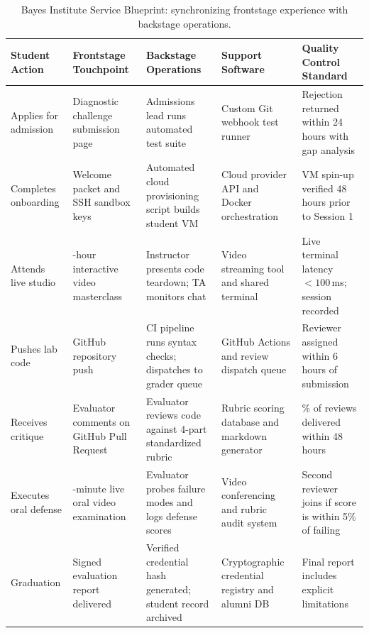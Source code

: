 \begin{table}[t]
\centering
\small
\begin{tabularx}{\textwidth}{>{\raggedright\arraybackslash}p{2.5cm} >{\raggedright\arraybackslash}p{3.2cm} >{\raggedright\arraybackslash}p{3.5cm} >{\raggedright\arraybackslash}p{3.8cm} >{\raggedright\arraybackslash}X}
\toprule
\textbf{Student Action} & \textbf{Frontstage Touchpoint} & \textbf{Backstage Operations} & \textbf{Support Software} & \textbf{Quality Control Standard} \\
\midrule
Applies for admission & Diagnostic challenge submission page & Admissions lead runs automated test suite & Custom Git webhook test runner & Rejection returned within 24 hours with gap analysis \\
Completes onboarding & Welcome packet and SSH sandbox keys & Automated cloud provisioning script builds student VM & Cloud provider API and Docker orchestration & VM spin-up verified 48 hours prior to Session 1 \\
Attends live studio & 2-hour interactive video masterclass & Instructor presents code teardown; TA monitors chat & Video streaming tool and shared terminal & Live terminal latency $< 100$\,ms; session recorded \\
Pushes lab code & GitHub repository push & CI pipeline runs syntax checks; dispatches to grader queue & GitHub Actions and review dispatch queue & Reviewer assigned within 6 hours of submission \\
Receives critique & Evaluator comments on GitHub Pull Request & Evaluator reviews code against 4-part standardized rubric & Rubric scoring database and markdown generator & 100\% of reviews delivered within 48 hours \\
Executes oral defense & 30-minute live oral video examination & Evaluator probes failure modes and logs defense scores & Video conferencing and rubric audit system & Second reviewer joins if score is within 5\% of failing \\
Graduation & Signed evaluation report delivered & Verified credential hash generated; student record archived & Cryptographic credential registry and alumni DB & Final report includes explicit limitations \\
\bottomrule
\end{tabularx}
\caption{Bayes Institute Service Blueprint: synchronizing frontstage experience with backstage operations.}
\label{tab:ch10-bayes-blueprint}
\end{table}
